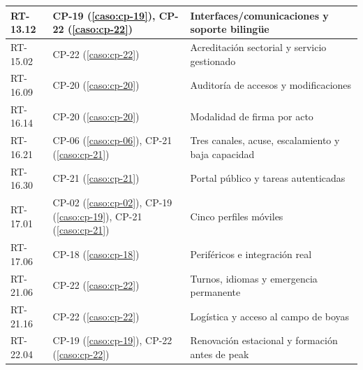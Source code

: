 \begin{longtable}{L{.17\textwidth}L{.31\textwidth}L{.42\textwidth}}
RT-13.12 & CP-19 (\ref{caso:cp-19}), CP-22 (\ref{caso:cp-22}) & Interfaces/comunicaciones y soporte bilingüe\\\hline
RT-15.02 & CP-22 (\ref{caso:cp-22}) & Acreditación sectorial y servicio gestionado\\\hline
RT-16.09 & CP-20 (\ref{caso:cp-20}) & Auditoría de accesos y modificaciones\\\hline
RT-16.14 & CP-20 (\ref{caso:cp-20}) & Modalidad de firma por acto\\\hline
RT-16.21 & CP-06 (\ref{caso:cp-06}), CP-21 (\ref{caso:cp-21}) & Tres canales, acuse, escalamiento y baja capacidad\\\hline
RT-16.30 & CP-21 (\ref{caso:cp-21}) & Portal público y tareas autenticadas\\\hline
RT-17.01 & CP-02 (\ref{caso:cp-02}), CP-19 (\ref{caso:cp-19}), CP-21 (\ref{caso:cp-21}) & Cinco perfiles móviles\\\hline
RT-17.06 & CP-18 (\ref{caso:cp-18}) & Periféricos e integración real\\\hline
RT-21.06 & CP-22 (\ref{caso:cp-22}) & Turnos, idiomas y emergencia permanente\\\hline
RT-21.16 & CP-22 (\ref{caso:cp-22}) & Logística y acceso al campo de boyas\\\hline
RT-22.04 & CP-19 (\ref{caso:cp-19}), CP-22 (\ref{caso:cp-22}) & Renovación estacional y formación antes de peak\\\hline
\end{longtable}
